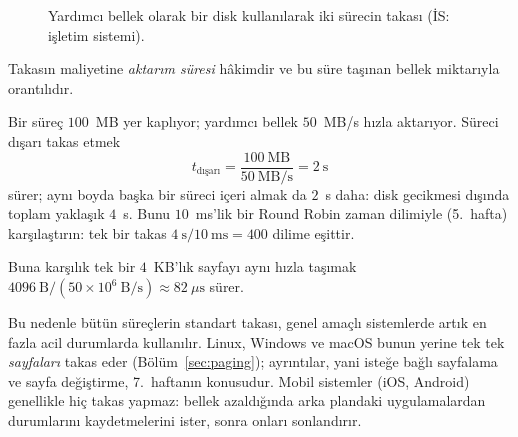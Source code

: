\begin{figure}[H]
\centering
{}
\caption{Yardımcı bellek olarak bir disk kullanılarak iki sürecin takası (İS: işletim sistemi).}
\end{figure}

Takasın maliyetine \emph{aktarım süresi} hâkimdir ve bu süre taşınan bellek miktarıyla orantılıdır.

\begin{example}
Bir süreç $100$~MB yer kaplıyor; yardımcı bellek $50$~MB/s hızla aktarıyor. Süreci dışarı takas etmek
\[
t_{\text{dışarı}} = \frac{100\ \text{MB}}{50\ \text{MB/s}} = 2\ \text{s}
\]
sürer; aynı boyda başka bir süreci içeri almak da $2$~s daha: disk gecikmesi dışında toplam yaklaşık $4$~s. Bunu $10$~ms'lik bir Round Robin zaman dilimiyle (5.~hafta) karşılaştırın: tek bir takas $4\ \text{s} / 10\ \text{ms} = 400$ dilime eşittir.

Buna karşılık tek bir $4$~KB'lık sayfayı aynı hızla taşımak $4096\ \text{B} / (50\times10^{6}\ \text{B/s}) \approx 82\ \mu\text{s}$ sürer.
\end{example}

Bu nedenle bütün süreçlerin standart takası, genel amaçlı sistemlerde artık en fazla acil durumlarda kullanılır. Linux, Windows ve macOS bunun yerine tek tek \emph{sayfaları} takas eder (Bölüm~\ref{sec:paging}); ayrıntılar, yani isteğe bağlı sayfalama ve sayfa değiştirme, 7.~haftanın konusudur. Mobil sistemler (iOS, Android) genellikle hiç takas yapmaz: bellek azaldığında arka plandaki uygulamalardan durumlarını kaydetmelerini ister, sonra onları sonlandırır.

